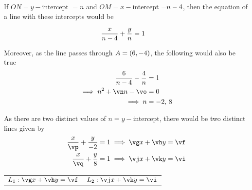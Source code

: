 \vspace{0.7cm}
\centerline{\box\figBoxA}

\ADD\vb\vc\vm
\SUBTRACT\vm\va\vn
\MULTIPLY\vb\vc\vo
\SUBTRACT\vd\vc\vp
\SUBTRACT\ve\vc\vq

\LCM\vp\vd\vf
\DIVIDE\vf\vp\vg
\DIVIDE\vf\vd\vh
\LCM\vq\ve\vi
\DIVIDE\vi\vq\vj
\DIVIDE\vi\ve\vk

\begin{solution}[\halfpage]
  If $ON = y-$intercept $=n$ and $OM = x-$intercept =$n - 4$,
  then the equation of a line with these intercepts would be 

  \begin{align}
    \dfrac{x}{n-4} + \dfrac{y}{n} &= 1
  \end{align}

  Moreover, as the line passes through $A = (6, -4)$,
  the following would also be true
  \begin{align}
    \dfrac{\va}{n-\vc}-\dfrac{\vb}{n} &= 1 \\
    \implies n^2 + \vn n - \vo &= 0 \\
    \implies n &= \vd,\, \ve
  \end{align}

  As there are two distinct values of $n = y-$intercept, 
  there would be two distinct lines given by 
  \begin{align}
    \frac{x}{\vp} + \frac{y}{\vd} &= 1 \implies \vg x + \vh y = \vf \\
    \frac{x}{\vq} + \frac{y}{\ve} &= 1 \implies \vj x + \vk y = \vi
  \end{align}
\end{solution}

\ifprintanswers
  \begin{codex}
    \begin{tabular}{l l}
      $L_1: \vg x + \vh y = \vf$ & 
      $L_2: \vj x + \vk y = \vi$ \\
    \end{tabular}
  \end{codex}
\fi
